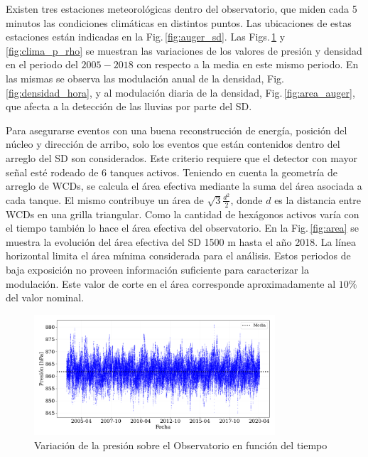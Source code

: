Existen tres estaciones meteorológicas dentro del observatorio, que miden cada 5 minutos las condiciones climáticas en distintos puntos. Las ubicaciones de estas estaciones están indicadas en la Fig.\,\ref{fig:auger_sd}. Las Figs.\,\ref{fig:clima_p} y \ref{fig:clima_p_rho} se muestran las variaciones de los valores de presión y densidad en el periodo del $2005-2018$ con respecto a la media en este mismo periodo. En las mismas se observa las modulación anual de la densidad, Fig.\,\ref{fig:densidad_hora}, y al modulación diaria de la densidad, Fig.\,\ref{fig:area_auger}, que afecta a la detección de las lluvias por parte del SD. 

Para asegurarse eventos con una buena reconstrucción de  energía, posición del núcleo y dirección de arribo, solo los eventos que están contenidos dentro del arreglo del SD son considerados. Este criterio requiere que el detector con mayor señal esté rodeado de 6 tanques activos. Teniendo en cuenta la geometría de arreglo de WCDs, se calcula el área efectiva mediante la suma del área asociada a cada tanque. El mismo contribuye un área de $\sqrt{3} \frac{d^2}{2}$, donde $d$ es la distancia entre WCDs en una grilla triangular. Como la cantidad de hexágonos activos varía con el tiempo también lo hace  el área efectiva del observatorio. En la Fig.\,\ref{fig:area} se muestra la evolución del área efectiva del SD 1500 m hasta el año 2018. La línea horizontal  limita el área mínima considerada para el análisis. Estos periodos de baja exposición no proveen información suficiente para caracterizar la modulación.
Este valor de corte en el área corresponde aproximadamente al $10\%$ del valor nominal.

\begin{figure}[H]
	\centering
		\includegraphics[width=0.8\textwidth]{Graphs/clima/presion_v2.png}
	\caption{Variación de la presión sobre el Observatorio en función del tiempo}
  \label{fig:clima_p}
\end{figure}



